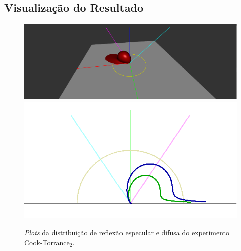 \subsection{Visualização do Resultado}
\begin{figure}[H]
    \caption{\small{\textit{Plots} da distribuição de reflexão especular e difusa do experimento Cook-Torrance$_2$.}}
    \label{fig-cook-torrance-alternative-plots}
    \vspace{42px}
  \includegraphics[width=\linewidth]{./Imagens/brdfs/cook-torrance-alternative-3D-plot}
\endminipage\hfill
{}
  \includegraphics[width=\linewidth]{./Imagens/brdfs/cook-torrance-alternative-polar-plot-log.png}
\endminipage\hfill
\end{figure}


